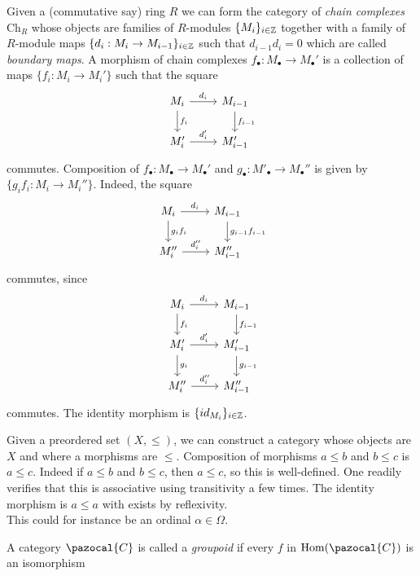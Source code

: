 \begin{example}
    Given a (commutative say) ring $R$ we can form the category of \emph{chain complexes} $\mathrm{Ch}_R$ whose objects are families of $R$-modules $\{M_i\}_{i\in\mathbb{Z}}$ together with a family of $R$-module maps $\{d_i : M_i\rightarrow M_{i-1}\}_{i\in \mathbb{Z}}$ such that $d_{i-1}d_i=0$ which are called \emph{boundary maps}. A morphism of chain complexes $f_\bullet : M_\bullet \rightarrow M_\bullet'$ is a collection of maps $\{f_i : M_i \rightarrow M_i'\}$ such that the square
    $$
        \begin{tikzcd}
            M_i \arrow[r,"d_i"]\arrow[d,"f_i"] & M_{i-1}\arrow[d,"f_{i-1}"]\\
            M_i' \arrow[r,"d_i'"] & M_{i-1}'
        \end{tikzcd}
    $$
    commutes. Composition of $f_\bullet : M_\bullet \rightarrow M_\bullet'$ and $g_\bullet : M'_\bullet \rightarrow M_\bullet''$ is given by $\{g_if_i : M_i\rightarrow M_i''\}$. Indeed, the square 
    $$
        \begin{tikzcd}
            M_i \arrow[r,"d_i"]\arrow[d,"g_if_i"] & M_{i-1}\arrow[d,"g_{i-1}f_{i-1}"]\\
            M_i'' \arrow[r,"d_i''"] & M_{i-1}''
        \end{tikzcd}
    $$ 
    commutes, since 
    $$
        \begin{tikzcd}
            M_i \arrow[r,"d_i"]\arrow[d,"f_i"] & M_{i-1}\arrow[d,"f_{i-1}"]\\
            M_i' \arrow[r,"d_i'"]\arrow[d,"g_i"] & M_{i-1}'\arrow[d,"g_{i-1}"]\\
            M_i'' \arrow[r,"d_i''"] & M_{i-1}''
        \end{tikzcd}
    $$
    commutes. The identity morphism is $\{id_{M_i}\}_{i\in\mathbb{Z}}$.
\end{example} 
\begin{example}
    Given a preordered set $(X,\leq)$, we can construct a category whose objects are $X$ and where a morphisms are $\leq$. Composition of morphisms $a\leq b$ and $b\leq c$ is $a\leq c$. Indeed if $a\leq b$ and $b\leq c$, then $a\leq c$, so this is well-defined. One readily verifies that this is associative using transitivity a few times. The identity morphism is $a\leq a$ with exists by reflexivity.\\
    This could for instance be an ordinal $\alpha\in \Omega$.
\end{example}
\begin{definition}
    A category $\pazocal{C}$ is called a \textit{groupoid} if every $f$ in $\Hom(\pazocal{C})$ is an isomorphism
\end{definition}
